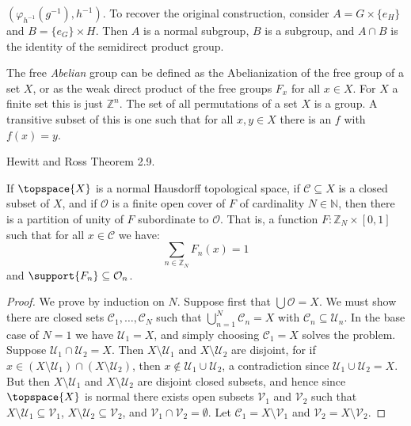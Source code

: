 $(\varphi_{h^{\minus{1}}}(g^{\minus{1}}),h^{\minus{1}})$. To recover the original
construction, consider $A=G\times\{e_{H}\}$ and $B=\{e_{G}\}\times{H}$. Then
$A$ is a normal subgroup, $B$ is a subgroup, and $A\cap{B}$ is the identity of
the semidirect product group.
\par\hfill\par
The free \textit{Abelian} group can be defined as the Abelianization of the free
group of a set $X$, or as the weak direct product of the free groups $F_{x}$ for
all $x\in{X}$. For $X$ a finite set this is just $\mathbb{Z}^{n}$. The set of
all permutations of a set $X$ is a group. A transitive subset of this is one
such that for all $x,y\in{X}$ there is an $f$ with $f(x)=y$.
\par\hfill\par
Hewitt and Ross Theorem 2.9.
\par\hfill\par
\begin{theorem}
    If $\topspace{X}$ is a normal Hausdorff topological space, if
    $\mathcal{C}\subseteq{X}$ is a closed subset of $X$, and if $\mathcal{O}$ is
    a finite open cover of $F$ of cardinality $N\in\mathbb{N}$, then there is a
    partition of unity of $F$ subordinate to $\mathcal{O}$. That is, a function
    $F:\mathbb{Z}_{N}\times[0,1]$ such that for all $x\in\mathcal{C}$ we have:
    \begin{equation}
        \sum_{n\in\mathbb{Z}_{N}}F_{n}(x)=1
    \end{equation}
    and $\support{F_{n}}\subseteq\mathcal{O}_{n}$.
\end{theorem}
\begin{proof}
    We prove by induction on $N$. Suppose first that $\bigcup\mathcal{O}=X$. We
    must show there are closed sets $\mathcal{C}_{1},\dots,\mathcal{C}_{N}$ such
    that $\bigcup_{n=1}^{N}\mathcal{C}_{n}=X$ with
    $\mathcal{C}_{n}\subseteq\mathcal{U}_{n}$. In the base case of $N=1$ we have
    $\mathcal{U}_{1}=X$, and simply choosing $\mathcal{C}_{1}=X$ solves the
    problem. Suppose $\mathcal{U}_{1}\cap\mathcal{U}_{2}=X$. Then
    $X\setminus\mathcal{U}_{1}$ and $X\setminus\mathcal{U}_{2}$ are disjoint,
    for if $x\in(X\setminus\mathcal{U}_{1})\cap(X\setminus\mathcal{U}_{2})$,
    then $x\notin\mathcal{U}_{1}\cup\mathcal{U}_{2}$, a contradiction since
    $\mathcal{U}_{1}\cup\mathcal{U}_{2}=X$. But then $X\setminus\mathcal{U}_{1}$
    and $X\setminus\mathcal{U}_{2}$ are disjoint closed subsets, and hence since
    $\topspace{X}$ is normal there exists open subsets $\mathcal{V}_{1}$ and
    $\mathcal{V}_{2}$ such that
    $X\setminus\mathcal{U}_{1}\subseteq\mathcal{V}_{1}$,
    $X\setminus\mathcal{U}_{2}\subseteq\mathcal{V}_{2}$, and
    $\mathcal{V}_{1}\cap\mathcal{V}_{2}=\emptyset$. Let
    $\mathcal{C}_{1}=X\setminus\mathcal{V}_{1}$ and
    $\mathcal{V}_{2}=X\setminus\mathcal{V}_{2}$.
\end{proof}
